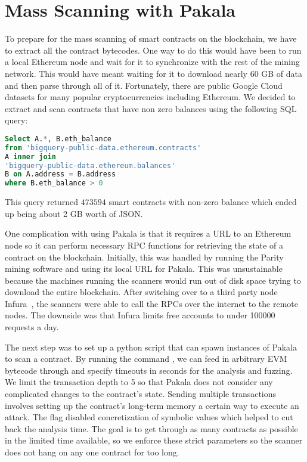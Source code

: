 \section{Mass Scanning with Pakala}
To prepare for the mass scanning of smart contracts on the blockchain, we have to extract all the contract bytecodes.
One way to do this would have been to run a local Ethereum node and wait for it to synchronize with the rest of the mining network.
This would have meant waiting for it to download nearly 60 GB of data and then parse through all of it.
Fortunately, there are public Google Cloud datasets for many popular cryptocurrencies including Ethereum.
We decided to extract and scan contracts that have non zero balances using the following SQL query: 
\begin{lstlisting}[language=SQL, basicstyle=\small]
Select A.*, B.eth_balance 
from 'bigquery-public-data.ethereum.contracts' 
A inner join 
'bigquery-public-data.ethereum.balances' 
B on A.address = B.address 
where B.eth_balance > 0
\end{lstlisting}
This query returned $473594$ smart contracts with non-zero balance which ended up being about 2 GB worth of JSON.

One complication with using Pakala is that it requires a URL to an Ethereum node so it can perform necessary RPC functions for retrieving the state of a contract on the blockchain.
Initially, this was handled by running the Parity~\cite{parity} mining software and using its local URL for Pakala.
This was unsustainable because the machines running the scanners would run out of disk space trying to download the entire blockchain.
After switching over to a third party node Infura~\cite{infura}, the scanners were able to call the RPCs over the internet to the remote nodes.
The downside was that Infura limits free accounts to under 100000 requests a day.

The next step was to set up a python script that can spawn instances of Pakala to scan a contract.
By running the command 
, 
we can feed in arbitrary EVM bytecode through  and specify timeouts in seconds for the analysis and fuzzing.
We limit the transaction depth to 5 so that Pakala does not consider any complicated changes to the contract's state.
Sending multiple transactions involves setting up the contract's long-term memory a certain way to execute an attack.
The  flag disabled concretization of symbolic values which helped to cut back the analysis time.
The goal is to get through as many contracts as possible in the limited time available, so we enforce these strict parameters so the scanner does not hang on any one contract for too long.

